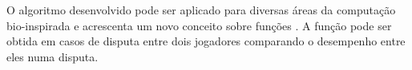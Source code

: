 O algoritmo desenvolvido pode ser aplicado para diversas áreas da computação bio-inspirada e acrescenta um novo conceito sobre funções \fitness. A função \fitness pode ser obtida em casos de disputa entre dois jogadores comparando o desempenho entre eles numa disputa.